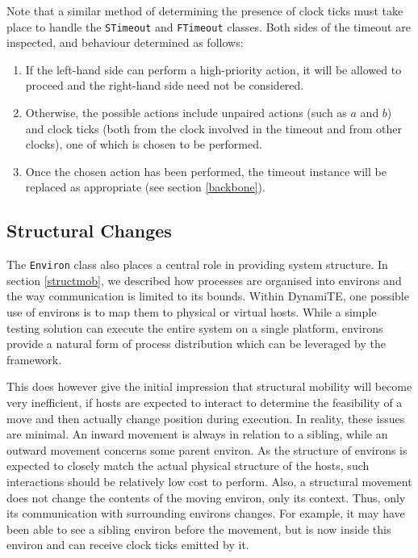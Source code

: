 \documentclass{acm_proc_article-sp}
\begin{document}
Note that a similar method of determining the presence of clock ticks
must take place to handle the \texttt{STimeout} and \texttt{FTimeout}
classes.  Both sides of the timeout are inspected, and behaviour
determined as follows:
\begin{enumerate}
\item If the left-hand side can perform a high-priority action, it will
      be allowed to proceed and the right-hand side need not be
      considered.
\item Otherwise, the possible actions include unpaired actions (such as
      $a$ and $b$) and clock ticks (both from the clock involved in the
      timeout and from other clocks), one of which is chosen to be
      performed.
\item Once the chosen action has been performed, the timeout instance
      will be replaced as appropriate (see section \ref{backbone}). 
\end{enumerate}

\subsection{Structural Changes}
\label{structchange}

The \texttt{Environ} class also places a central role in providing
system structure.  In section \ref{structmob}, we described how
processes are organised into environs and the way communication is
limited to its bounds.  Within DynamiTE, one possible use of environs
is to map them to physical or virtual hosts.  While a simple testing
solution can execute the entire system on a single platform, environs
provide a natural form of process distribution which can be leveraged by
the framework.

This does however give the initial impression that structural mobility
will become very inefficient, if hosts are expected to interact to
determine the feasibility of a move and then actually change position
during execution.  In reality, these issues are minimal.  An inward
movement is always in relation to a sibling, while an outward movement
concerns some parent environ.  As the structure of environs is expected
to closely match the actual physical structure of the hosts, such
interactions should be relatively low cost to perform.  Also, a
structural movement does not change the contents of the moving environ,
only its context.  Thus, only its communication with surrounding
environs changes.  For example, it may have been able to see a sibling
environ before the movement, but is now inside this environ and can
receive clock ticks emitted by it.
\end{document}
